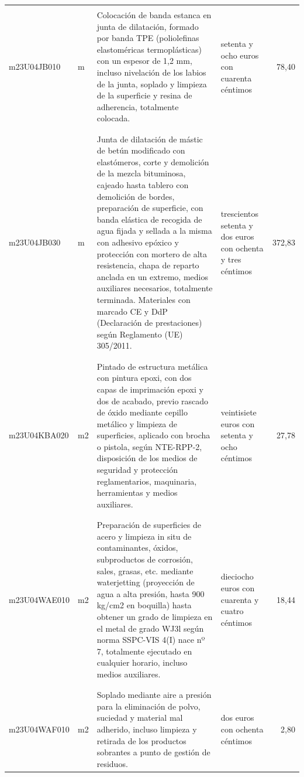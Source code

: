 \documentclass{book}%
\begin{document}
\begin{longtable}{|l|l|p{5cm}|p{3cm}|r|}
&&&&\\%
m23U04JB010&m&Colocación de banda estanca en junta de dilatación, formado por banda TPE (poliolefinas elastoméricas termoplásticas) con un espesor de 1,2 mm, incluso nivelación de los labios de la junta, soplado y limpieza de la superficie y resina de adherencia, totalmente colocada.&setenta y ocho euros con cuarenta céntimos&78,40\\%
&&&&\\%
&&&&\\%
m23U04JB030&m&Junta de dilatación de mástic de betún modificado con elastómeros, corte y demolición de la mezcla bituminosa, cajeado hasta tablero con demolición de bordes, preparación de superficie, con banda elástica de recogida de agua fijada y sellada a la misma con adhesivo epóxico y protección con mortero de alta resistencia, chapa de reparto anclada en un extremo, medios auxiliares necesarios, totalmente terminada. Materiales con marcado CE y DdP (Declaración de prestaciones) según Reglamento (UE) 305/2011.&trescientos setenta y dos euros con ochenta y tres céntimos&372,83\\%
&&&&\\%
&&&&\\%
m23U04KBA020&m2&Pintado de estructura metálica con pintura epoxi, con dos capas de imprimación epoxi y dos de acabado, previo rascado de óxido mediante cepillo metálico y limpieza de superficies, aplicado con brocha o pistola, según NTE{-}RPP{-}2, disposición de los medios de seguridad y protección reglamentarios, maquinaria, herramientas y medios auxiliares.&veintisiete euros con setenta y ocho céntimos&27,78\\%
&&&&\\%
&&&&\\%
m23U04WAE010&m2&Preparación de superficies de acero y limpieza in situ de contaminantes, óxidos, subproductos de corrosión, sales, grasas, etc. mediante waterjetting (proyección de agua a alta presión, hasta 900 kg/cm2 en boquilla) hasta obtener un grado de limpieza en el metal de grado WJ3l según norma SSPC{-}VIS 4(I) nace nº 7, totalmente ejecutado en cualquier horario, incluso medios auxiliares.&dieciocho euros con cuarenta y cuatro céntimos&18,44\\%
&&&&\\%
&&&&\\%
m23U04WAF010&m2&Soplado mediante aire a presión para la eliminación de polvo, suciedad y material mal adherido, incluso limpieza y retirada de los productos sobrantes a punto de gestión de residuos.&dos euros con ochenta céntimos&2,80\\%

\end{longtable}
\end{document}
